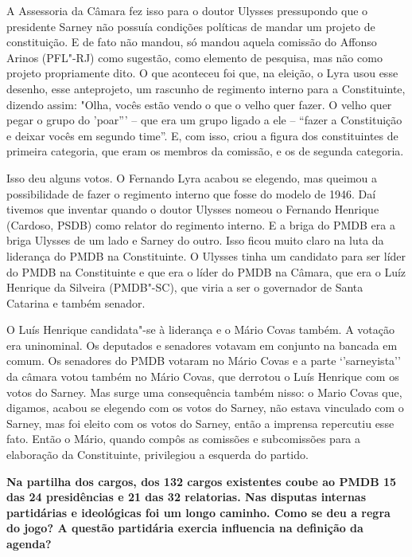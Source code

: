 A Assessoria da Câmara fez isso para o doutor Ulysses pressupondo que o
presidente Sarney não possuía condições políticas de mandar um projeto
de constituição. E de fato não mandou, só mandou aquela comissão do
Affonso Arinos (PFL"-RJ) como sugestão, como elemento de pesquisa, mas
não como projeto propriamente dito. O que aconteceu foi que, na eleição,
o Lyra usou esse desenho, esse anteprojeto, um rascunho de regimento
interno para a Constituinte, dizendo assim: "Olha, vocês estão vendo o
que o velho quer fazer. O velho quer pegar o grupo do 'poar''' -- que
era um grupo ligado a ele -- ``fazer a Constituição e deixar vocês em
segundo time''. E, com isso, criou a figura dos constituintes de
primeira categoria, que eram os membros da comissão, e os de segunda
categoria.

Isso deu alguns votos. O Fernando Lyra acabou se elegendo, mas queimou a
possibilidade de fazer o regimento interno que fosse do modelo de 1946.
Daí tivemos que inventar quando o doutor Ulysses nomeou o Fernando
Henrique (Cardoso, PSDB) como relator do regimento interno. E a briga do
PMDB era a briga Ulysses de um lado e Sarney do outro. Isso ficou muito
claro na luta da liderança do PMDB na Constituinte. O Ulysses tinha um
candidato para ser líder do PMDB na Constituinte e que era o líder do
PMDB na Câmara, que era o Luíz Henrique da Silveira (PMDB"-SC), que viria
a ser o governador de Santa Catarina e também senador.

O Luís Henrique candidata"-se à liderança e o Mário Covas também. A
votação era uninominal. Os deputados e senadores votavam em conjunto na
bancada em comum. Os senadores do PMDB votaram no Mário Covas e a parte
`'sarneyista'' da câmara votou também no Mário Covas, que derrotou o
Luís Henrique com os votos do Sarney. Mas surge uma consequência também
nisso: o Mario Covas que, digamos, acabou se elegendo com os votos do
Sarney, não estava vinculado com o Sarney, mas foi eleito com os votos
do Sarney, então a imprensa repercutiu esse fato. Então o Mário, quando
compôs as comissões e subcomissões para a elaboração da Constituinte,
privilegiou a esquerda do partido.

\textbf{Na partilha dos cargos, dos 132 cargos existentes coube ao PMDB
15 das 24 presidências e 21 das 32 relatorias. Nas disputas internas
partidárias e ideológicas foi um longo caminho. Como se deu a regra do
jogo? A questão partidária exercia influencia na definição da agenda?}


